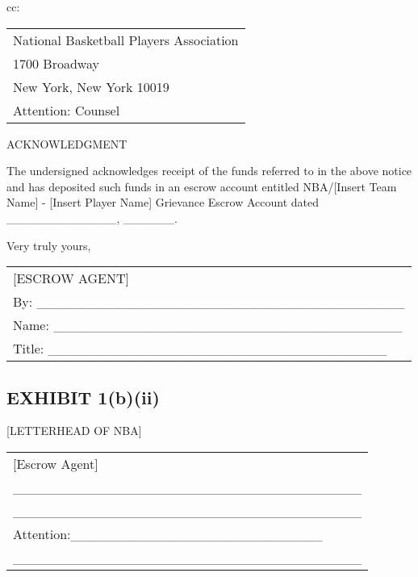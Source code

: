 \documentclass[
]{book}
\begin{document}
cc:

\begin{longtable}[]{@{}l@{}}
\toprule()
\endhead
National Basketball Players Association \\
1700 Broadway \\
New York, New York 10019 \\
Attention: Counsel \\
\bottomrule()
\end{longtable}

\newpage

ACKNOWLEDGMENT

The undersigned acknowledges receipt of the funds referred to in the above notice and has deposited such funds in an escrow account entitled NBA/{[}Insert Team Name{]} - {[}Insert Player Name{]} Grievance Escrow Account dated \_\_\_\_\_\_\_\_\_\_\_\_\_, \_\_\_\_\_\_.

Very truly yours,

\begin{longtable}[]{@{}l@{}}
\toprule()
\endhead
{[}ESCROW AGENT{]} \\
By: \_\_\_\_\_\_\_\_\_\_\_\_\_\_\_\_\_\_\_\_\_\_\_\_\_\_\_\_\_\_\_\_\_\_\_\_\_\_ \\
Name: \_\_\_\_\_\_\_\_\_\_\_\_\_\_\_\_\_\_\_\_\_\_\_\_\_\_\_\_\_\_\_\_\_\_\_\_ \\
Title: \_\_\_\_\_\_\_\_\_\_\_\_\_\_\_\_\_\_\_\_\_\_\_\_\_\_\_\_\_\_\_\_\_\_\_ \\
\bottomrule()
\end{longtable}

\hypertarget{exhibit-1bii}{%
\subsection{EXHIBIT 1(b)(ii)}\label{exhibit-1bii}}

{[}LETTERHEAD OF NBA{]}

\begin{longtable}[]{@{}l@{}}
\toprule()
\endhead
{[}Escrow Agent{]} \\
\_\_\_\_\_\_\_\_\_\_\_\_\_\_\_\_\_\_\_\_\_\_\_\_\_\_\_\_\_\_\_\_\_\_\_\_ \\
\_\_\_\_\_\_\_\_\_\_\_\_\_\_\_\_\_\_\_\_\_\_\_\_\_\_\_\_\_\_\_\_\_\_\_\_ \\
Attention:\_\_\_\_\_\_\_\_\_\_\_\_\_\_\_\_\_\_\_\_\_\_\_\_\_\_ \\
\_\_\_\_\_\_\_\_\_\_\_\_\_\_\_\_\_\_\_\_\_\_\_\_\_\_\_\_\_\_\_\_\_\_\_\_ \\
\bottomrule()
\end{longtable}
\end{document}
